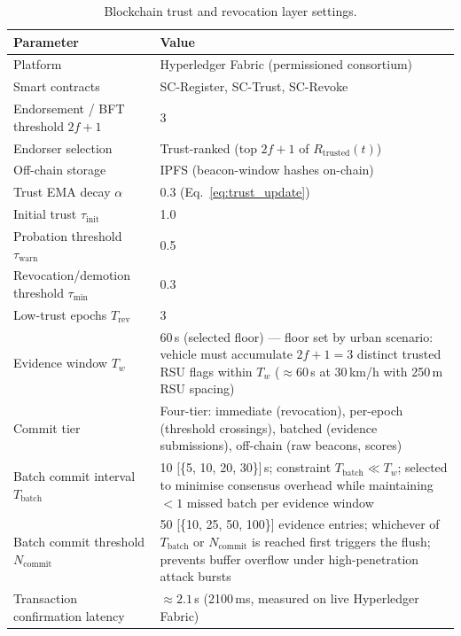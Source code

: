 \documentclass[12pt, a4paper]{report}
\begin{document}
\begin{table}[H]
\centering
\caption{Blockchain trust and revocation layer settings.}
\label{tab:set-blockchain}
\renewcommand{\arraystretch}{1.15}
\begin{tabular}{|p{5.2cm}|p{8.8cm}|}
\hline
\textbf{Parameter} & \textbf{Value} \\
\hline
Platform                             & Hyperledger Fabric (permissioned consortium) \\
\hline
Smart contracts                      & SC-Register, SC-Trust, SC-Revoke \\
\hline
Endorsement / BFT threshold $2f{+}1$ & 3 \\
\hline
Endorser selection                   & Trust-ranked (top $2f{+}1$ of $R_{\text{trusted}}(t)$) \\
\hline
Off-chain storage                    & IPFS (beacon-window hashes on-chain) \\
\hline
Trust EMA decay $\alpha$             & 0.3 (Eq.~\ref{eq:trust_update}) \\
\hline
Initial trust $\tau_{\mathrm{init}}$ & 1.0 \\
\hline
Probation threshold $\tau_{\mathrm{warn}}$         & 0.5 \\
\hline
Revocation/demotion threshold $\tau_{\min}$        & 0.3 \\
\hline
Low-trust epochs $T_{\mathrm{rev}}$  & 3 \\
\hline
Evidence window $T_w$        & 60\,s (selected floor) ---
                               floor set by urban scenario:
                               vehicle must accumulate $2f{+}1=3$
                               distinct trusted RSU flags within $T_w$
                               (${\approx}60$\,s at 30\,km/h
                               with 250\,m RSU spacing) \\
\hline
Commit tier                          & Four-tier: immediate (revocation),
                                       per-epoch (threshold crossings),
                                       batched (evidence submissions),
                                       off-chain (raw beacons, scores) \\
\hline
Batch commit interval $T_{\mathrm{batch}}$
  & 10 [\{5, 10, 20, 30\}]\,s;
    constraint $T_{\mathrm{batch}} \ll T_w$;
    selected to minimise consensus overhead while
    maintaining $< 1$ missed batch per evidence window \\
\hline
Batch commit threshold $N_{\mathrm{commit}}$
  & 50 [\{10, 25, 50, 100\}] evidence entries;
    whichever of $T_{\mathrm{batch}}$ or $N_{\mathrm{commit}}$
    is reached first triggers the flush;
    prevents buffer overflow under high-penetration attack bursts \\
\hline
Transaction confirmation latency     & ${\approx}2.1$\,s (2100\,ms, measured on
                                       live Hyperledger Fabric) \\
\hline
\end{tabular}
\end{table}
\end{document}
